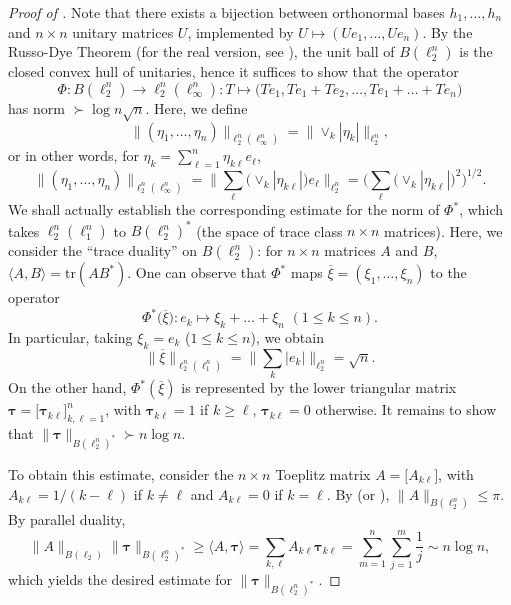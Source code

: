 \documentclass[12pt,leqno]{amsart}
\numberwithin{equation}{section}
\theoremstyle{definition}
\begin{document}
\begin{proof}[Proof of ]
Note that there exists a bijection between orthonormal bases $h_1, \ldots, h_n$ and $n \times n$ unitary matrices $U$, implemented by $U \mapsto (Ue_1, \ldots, Ue_n)$.
By the Russo-Dye Theorem (for the real version, see \cite{unitary-operators}), the unit ball of $B(\ell_2^n)$ is the closed convex hull of unitaries, hence it suffices to show that the operator
$$
\Phi : B(\ell_2^n) \to \ell_2^n(\ell_\infty^n) : T \mapsto \big( Te_1, Te_1 + Te_2, \ldots, Te_1 + \ldots + Te_n \big)
$$
has norm $\succ \log n \sqrt{n}$. Here, we define
$$
\big\|(\eta_1, \ldots, \eta_n) \big\|_{\ell_2^n(\ell_\infty^n)} = \big\| \vee_k |\eta_k| \big\|_{\ell_2^n},
$$
or in other words, for $\eta_k = \sum_{\ell=1}^n \eta_{k\ell} e_\ell$,
$$
\big\|(\eta_1, \ldots, \eta_n) \big\|_{\ell_2^n(\ell_\infty^n)} = \big\| \sum_\ell \big( \vee_k |\eta_{k\ell}| \big) e_\ell \big\|_{\ell_2^n} = \Big( \sum_\ell  \big( \vee_k |\eta_{k\ell}| \big)^2 \Big)^{1/2} .
$$
We shall actually establish the corresponding estimate for the norm of $\Phi^*$, which takes $\ell_2^n(\ell_1^n)$ to $B(\ell_2^n)^*$ (the space of trace class $n \times n$ matrices).
Here, we consider the ``trace duality'' on $B(\ell_2^n)$: for $n \times n$ matrices $A$ and $B$,
$\langle A, B \rangle = {\mathrm{tr}}(A B^*)$.
One can observe that $\Phi^*$ maps $\overline{\xi} = (\xi_1, \ldots, \xi_n)$ to the operator
$$
\Phi^* \big( \overline{\xi} \big) : e_k \mapsto \xi_k + \ldots + \xi_n \, \, (1 \leq k \leq n ) .
$$
In particular, taking $\xi_k = e_k$ ($1 \leq k \leq n$), we obtain
$$
\big\|\overline{\xi}\big\|_{\ell_2^n(\ell_1^n)} = \big\| \sum_k |e_k| \big\|_{\ell_2^n} = \sqrt{n} .
$$
On the other hand, $\Phi^*(\overline{\xi})$ is represented by the lower triangular matrix ${\mathbf{\tau}} = \big[ {\mathbf{\tau}}_{k\ell} \big]_{k,\ell=1}^n$, with ${\mathbf{\tau}}_{k\ell} = 1$ if $k \geq \ell$, ${\mathbf{\tau}}_{k\ell} =0$ otherwise. It remains to show that $\big\| {\mathbf{\tau}} \big\|_{B(\ell_2^n)^*} \succ n \log n$.
\medskip

To obtain this estimate, consider the $n \times n$ Toeplitz matrix $A = \big[ A_{k\ell} \big]$, with $A_{k\ell} = 1/(k-\ell)$ if $k \neq \ell$ and $A_{k\ell}=0$ if $k=\ell$.
By \cite{ACN} (or \cite{KP}), $\|A\|_{B(\ell_2^n)} \leq \pi$. %
By parallel duality,
$$
\|A\|_{B(\ell_2)} \big\| {\mathbf{\tau}} \big\|_{B(\ell_2^n)^*} \geq \langle A, {\mathbf{\tau}} \rangle = \sum_{k,\ell} A_{k\ell} {\mathbf{\tau}}_{k\ell} = \sum_{m=1}^n \sum_{j=1}^m \frac1j \sim n \log n ,
$$
which yields the desired estimate for $\big\| {\mathbf{\tau}} \big\|_{B(\ell_2^n)^*}$.
\end{proof}
\end{document}
